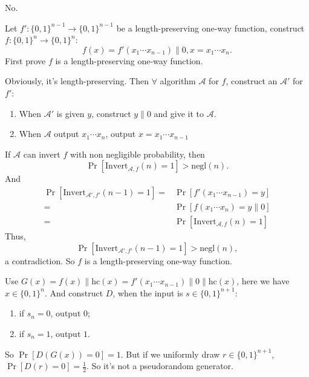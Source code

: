 \documentclass[a4paper]{article}
\newcommand{\negl}{\text{negl}}
\newcommand{\Invert}{\text{Invert}}
\newcommand{\hc}{\text{hc}}
\newcommand{\A}{\mathcal{A}}
\newenvironment{problem}[2][Problem]{\begin{trivlist}
\item[\hskip \labelsep {\bfseries #1}\hskip \labelsep {\bfseries #2.}]}{\end{trivlist}}
\begin{document}
\begin{problem}{7.6} 
$ $\par
No.\par
Let $f':\{0,1\}^{n-1}\rightarrow\{0,1\}^{n-1}$ be a length-preserving one-way function, construct $f:\{0,1\}^{n}\rightarrow\{0,1\}^{n}$:
\[f(x)=f'(x_1\cdots x_{n-1})\|0,x=x_1\cdots x_n.\]
First prove $f$ is a length-preserving one-way function. \par
Obviously, it's length-preserving. Then $\forall$ algorithm $\A$ for $f$, construct an $\A'$ for $f'$:\begin{enumerate}
    \item When $\A'$ is given $y$, construct $y\|0$ and give it to $\A$.
    \item When $\A$ output $x_1\cdots x_n$, output $x=x_1\cdots x_{n-1}$
\end{enumerate}
If $\A$ can invert $f$ with non negligible probability, then \[\Pr[\Invert_{\A,f}(n)=1]>\negl(n).\] 
And \begin{align*}
    \Pr[\Invert_{\A',f'}(n-1)=1]=&\Pr[f'(x_1\cdots x_{n-1})=y]\\
    =&\Pr[f(x_1\cdots x_{n})=y\|0]\\
    =&\Pr[\Invert_{\A,f}(n)=1]
\end{align*}
Thus, \[\Pr[\Invert_{\A',f'}(n-1)=1]>\negl(n),\] a contradiction.
So $f$ is a length-preserving one-way function.\par
Use $G(x)=f(x)\|\hc(x)=f'(x_1\cdots x_{n-1})\|0\|\hc(x)$, here we have $x\in\{0,1\}^n$. And construct $D$, when the input is $s\in\{0,1\}^{n+1}$:
\begin{enumerate}
    \item if $s_n=0$, output $0$;
    \item if $s_n=1$, output $1$.
\end{enumerate}
So $\Pr[D(G(x))=0]=1$. But if we uniformly draw $r\in\{0,1\}^{n+1}$, $\Pr[D(r)=0]=\frac12$. So it's not a pseudorandom generator.
\end{problem}
\end{document}
